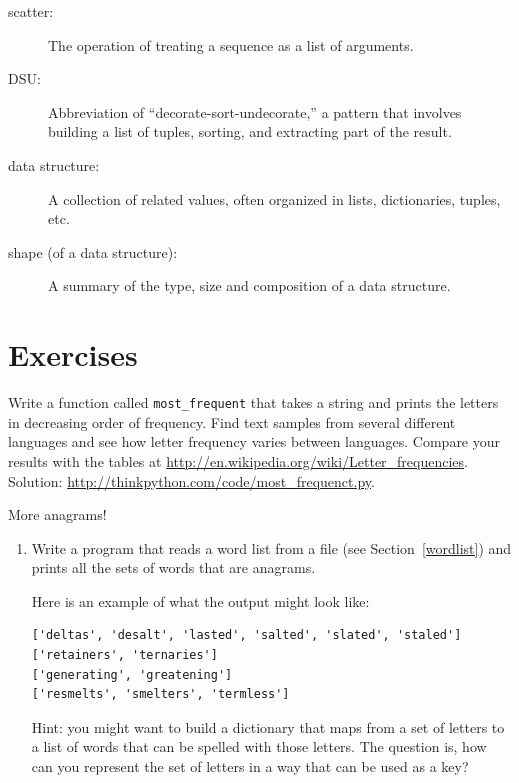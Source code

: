 \documentclass[10pt]{book}
\begin{document}
\begin{CJK}{UTF8}{gbsn}
\begin{description}
\item[scatter:] The operation of treating a sequence as a list of
arguments.

\item[DSU:] Abbreviation of ``decorate-sort-undecorate,'' a
pattern that involves building a list of tuples, sorting, and
extracting part of the result.

\item[data structure:] A collection of related values, often
organized in lists, dictionaries, tuples, etc.

\item[shape (of a data structure):] A summary of the type,
size and composition of a data structure.

\end{description}


\section{Exercises}

\begin{exercise}

Write a function called \verb"most_frequent" that takes a string and
prints the letters in decreasing order of frequency.  Find text
samples from several different languages and see how letter frequency
varies between languages.  Compare your results with the tables at
\url{http://en.wikipedia.org/wiki/Letter_frequencies}.  Solution:
\url{http://thinkpython.com/code/most_frequenct.py}.   

\end{exercise}


\begin{exercise}
\label{anagrams}

More anagrams!

\begin{enumerate}

\item Write a program
that reads a word list from a file (see Section~\ref{wordlist}) and
prints all the sets of words that are anagrams.

Here is an example of what the output might look like:

\begin{verbatim}
['deltas', 'desalt', 'lasted', 'salted', 'slated', 'staled']
['retainers', 'ternaries']
['generating', 'greatening']
['resmelts', 'smelters', 'termless']
\end{verbatim}
%
Hint: you might want to build a dictionary that maps from a
set of letters to a list of words that can be spelled with those
letters.  The question is, how can you represent the set of
letters in a way that can be used as a key?


\end{enumerate}
\end{exercise}
\end{CJK}
\end{document}
